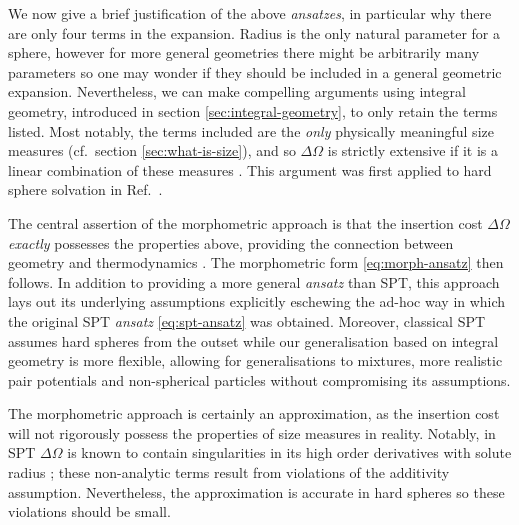 \documentclass[11pt,twoside]{report}
\begin{document}
We now give a brief justification of the above \emph{ansatzes}, in particular why there are only four terms in the expansion.
Radius is the only natural parameter for a sphere, however for more general geometries there might be arbitrarily many parameters so one may wonder if they should be included in a general geometric expansion.
Nevertheless, we can make compelling arguments using integral geometry, introduced in section \ref{sec:integral-geometry}, to only retain the terms listed.
Most notably, the terms included are the \emph{only} physically meaningful size measures (cf.\ section \ref{sec:what-is-size}), and so $\Delta \Omega$ is strictly extensive if it is a linear combination of these measures%
.
This argument was first applied to hard sphere solvation in Ref.\ \cite{KonigPRL2004}.

The central assertion of the morphometric approach is that the insertion cost $\Delta \Omega$ \emph{exactly} possesses the properties above, providing the connection between geometry and thermodynamics \cite{KonigPRL2004}.
The morphometric form \eqref{eq:morph-ansatz} then follows.
In addition to providing a more general \emph{ansatz} than SPT, this approach lays out its underlying assumptions explicitly eschewing the ad-hoc way in which the original SPT \emph{ansatz} \eqref{eq:spt-ansatz} was obtained.
Moreover, classical SPT assumes hard spheres from the outset while our generalisation based on integral geometry is more flexible, allowing for generalisations to mixtures, more realistic pair potentials and non-spherical particles without compromising its assumptions.

The morphometric approach is certainly an approximation, as the insertion cost will not rigorously possess the properties of size measures in reality.
Notably, in SPT $\Delta\Omega$ is known to contain singularities in its high order derivatives with solute radius%
;
these non-analytic terms result from violations of the additivity assumption.
Nevertheless, the approximation is accurate in hard spheres \cite{OettelEL2009,AshtonPRE2011,LairdPRE2012,BlokhuisPRE2013,UrrutiaPRE2014,Hansen-GoosJCP2014} so these violations should be small.
\end{document}
